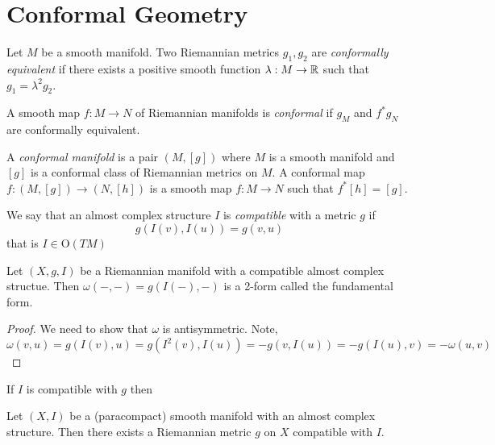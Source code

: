 \documentclass[12pt]{article}
\begin{document}
\section{Conformal Geometry}

\renewcommand{\C}{\mathcal{C}}

\begin{defn}
Let $M$ be a smooth manifold. Two Riemannian metrics $g_1, g_2$ are \textit{conformally equivalent} if there exists a positive smooth function $\lambda : M \to \mathbb{R}$ such that $g_1 = \lambda^2 g_2$.
\end{defn}

\begin{defn}
A smooth map $f : M \to N$ of Riemannian manifolds is \textit{conformal} if $g_M$ and $f^* g_N$ are conformally equivalent. 
\end{defn}

\begin{defn}
A \textit{conformal manifold} is a pair $(M, [g])$ where $M$ is a smooth manifold and $[g]$ is a conformal class of Riemannian metrics on $M$. A conformal map $f : (M, [g]) \to (N, [h])$ is a smooth map $f : M \to N$ such that $f^* [h] = [g]$.
\end{defn}

\begin{defn}
We say that an almost complex structure $I$ is \textit{compatible} with a metric $g$ if
\[ g(I(v), I(u)) = g(v, u) \]
that is $I \in \mathrm{O}(TM)$
\end{defn}

\begin{prop}
Let $(X, g, I)$ be a Riemannian manifold with a compatible almost complex structue. Then $\omega(-,-) = g(I(-), -)$ is a 2-form called the fundamental form.
\end{prop}

\begin{proof}
We need to show that $\omega$ is antisymmetric. Note,
\[ \omega(v, u) = g(I(v), u) = g(I^2(v), I(u)) = - g(v, I(u)) = - g(I(u), v) = - \omega(u, v) \]
\end{proof}

\begin{prop}
If $I$ is compatible with $g$ then 
\end{prop}

\begin{prop}
Let $(X, I)$ be a (paracompact) smooth manifold with an almost complex structure. Then there exists a Riemannian metric $g$ on $X$ compatible with $I$.
\end{prop}
\end{document}
